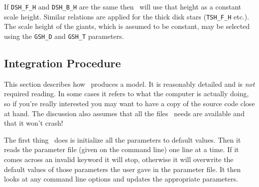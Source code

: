 \documentclass[11pt,twoside]{article}
\begin{document}
If {\tt DSH\_F\_H} and {\tt DSH\_B\_H} are the same then \bsm\ will use that 
height as a constant scale height. Similar relations are applied for the thick 
disk stars ({\tt TSH\_F\_H} etc.). The scale height of the giants, which is 
assumed to be constant, may be selected using the {\tt GSH\_D} and 
{\tt GSH\_T} parameters.

\subsection{Integration Procedure}


This section describes how \bsm\ produces a model. It is reasonably 
detailed and is {\em not} required reading. In some cases it refers to 
what the computer is actually doing, so if you're really interested
you may want to have a copy of the source code close at hand.
The discussion also assumes that all the files \bsm\ needs are available
and that it won't crash!

The first thing \bsm\ does is initialize all the parameters to default
values. Then it reads the parameter file (given on the command line)
one line at a time. If it comes across an invalid keyword it will stop,
otherwise it will overwrite the default values of those parameters the
user gave in the parameter file. It then looks at any command line
options and updates the appropriate parameters.
\end{document}
